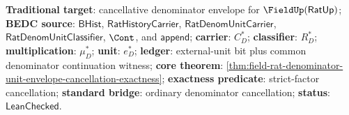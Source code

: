 \textbf{Traditional target}: cancellative denominator envelope for
$\FieldUp(\mathsf{RatUp})$; \textbf{BEDC source}: $\mathsf{BHist}$,
$\mathsf{RatHistoryCarrier}$, $\mathsf{RatDenomUnitCarrier}$,
$\mathsf{RatDenomUnitClassifier}$, $\Cont$, and $\mathsf{append}$;
\textbf{carrier}: $C_D^\ast$; \textbf{classifier}: $R_D^\ast$;
\textbf{multiplication}: $\mu_D^\ast$; \textbf{unit}: $e_D^\ast$;
\textbf{ledger}: external-unit bit plus common denominator continuation
witness; \textbf{core theorem}:
\autoref{thm:field-rat-denominator-unit-envelope-cancellation-exactness};
\textbf{exactness predicate}: strict-factor cancellation; \textbf{standard
bridge}: ordinary denominator cancellation; \textbf{status}:
$\mathsf{LeanChecked}$.
